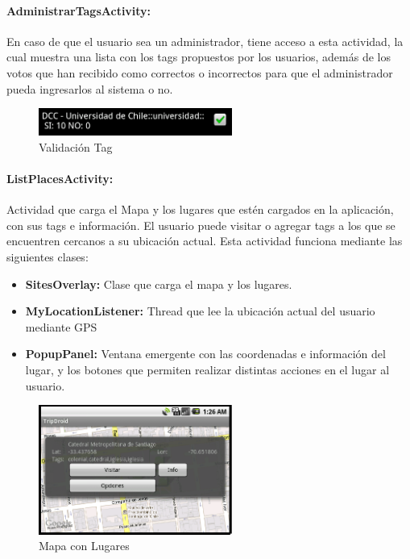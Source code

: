 \documentclass[10pt,letterpaper]{article}
\begin{document}
\newpage
\paragraph{AdministrarTagsActivity:} En caso de que el usuario sea un administrador, tiene acceso a esta actividad, la cual muestra una lista con los tags propuestos por los usuarios, además de los votos que han recibido como correctos o incorrectos para que el administrador pueda ingresarlos al sistema o no.

\begin{figure}[h]
\hspace{3cm}
\includegraphics[width=180pt]{./imgs/TripdroidAdmin.png}
\caption{Validación Tag}
\end{figure}

\paragraph{ListPlacesActivity:} Actividad que carga el Mapa y los lugares que estén cargados en la aplicación, con sus tags e información. El usuario puede visitar o agregar tags a los que se encuentren cercanos a su ubicación actual. Esta actividad funciona mediante las siguientes clases:\\

\begin{itemize}
 \item \textbf{SitesOverlay:} Clase que carga el mapa y los lugares.
 \item \textbf{MyLocationListener:} Thread que lee la ubicación actual del usuario mediante GPS
 \item \textbf{PopupPanel:} Ventana emergente con las coordenadas e información del lugar, y los botones que permiten realizar distintas acciones en el lugar al usuario.
\end{itemize}

\begin{figure}[h]
\hspace{3cm}
\includegraphics[width=180pt]{./imgs/TripdroidMapaMenu.png}
\caption{Mapa con Lugares}
\end{figure}
\end{document}
